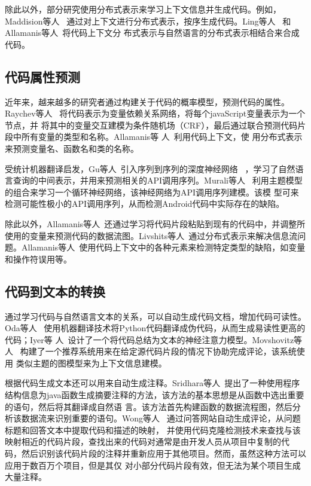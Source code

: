 除此以外，部分研究使用分布式表示来学习上下文信息并生成代码。例如，Maddision等人
~\cite{maddison2014structured}通过对上下文进行分布式表示，按序生成代码。Ling等人
~\cite{ling2016latent}和Allamanis等人~\cite{allamanis2015bimodal}将代码上下文分
布式表示与自然语言的分布式表示相结合来合成代码。

\subsection{代码属性预测}
近年来，越来越多的研究者通过构建关于代码的概率模型，预测代码的属性。Raychev等人
~\cite{raychev2015predicting}将代码表示为变量依赖关系网络，将每个javaScript变量表示为一个节点，并
将其中的变量交互建模为条件随机场（CRF），最后通过联合预测代码片段中所有变量的类型和名称。Allamanis等
人~\cite{allamanis2014learning,allamanis2015suggesting,allamanis2016convolutional}利用代码上下文，使
用分布式表示来预测变量名、函数名和类的名称。


受统计机器翻译启发，Gu等人~\cite{gu2016deep}引入序列到序列的深度神经网络
~\cite{sutskever2014sequence}，学习了自然语言查询的中间表示，并用来预测相关的API调用序列。Murali等人
~\cite{murali2017finding}利用主题模型的组合来学习一个循环神经网络，该神经网络为API调用序列建模。该模
型可来检测可能性极小的API调用序列，从而检测Android代码中实际存在的缺陷。

除此以外，Allamanis等人~\cite{allamanis2018learning}还通过学习将代码片段粘贴到现有的代码中，并调整所
使用的变量来预测代码的数据流图。Livshits等人~\cite{livshits2009merlin}通过分布式表示来解决信息流问
题。Allamanis等人~\cite{allamanis2018learning}使用代码上下文中的各种元素来检测特定类型的缺陷，如变量
和操作符误用等。


\subsection{代码到文本的转换}
通过学习代码与自然语言文本的关系，可以自动生成代码文档，增加代码可读性。Oda等人
~\cite{oda2015learning}使用机器翻译技术将Python代码翻译成伪代码，从而生成易读性更高的代码；Iyer等
人~\cite{iyer2016summarizing}设计了一个将代码总结为文本的神经注意力模型。Movshovitz等人
~\cite{movshovitz2013natural}构建了一个推荐系统用来在给定源代码片段的情况下协助完成评论，该系统使用
类似主题的图模型来为上下文信息建模。

根据代码生成文本还可以用来自动生成注释。Sridhara等人~\cite{sridhara2010towards}提出了一种使用程序
结构信息为java函数生成摘要注释的方法，该方法的基本思想是从函数中选出重要的语句，然后将其翻译成自然语
言。该方法首先构建函数的数据流程图，然后分析该数据流来识别重要的语句。Wong等人
~\cite{wong2013autocomment}通过问答网站自动生成评论，从问题标题和回答文本中提取代码和描述的映射，
并使用代码克隆检测技术来查找与该映射相近的代码片段，查找出来的代码对通常是由开发人员从项目中复制的代
码，然后识别该代码片段的注释并重新应用于其他项目。然而，虽然这种方法可以应用于数百万个项目，但是其仅
对小部分代码片段有效，但无法为某个项目生成大量注释。


